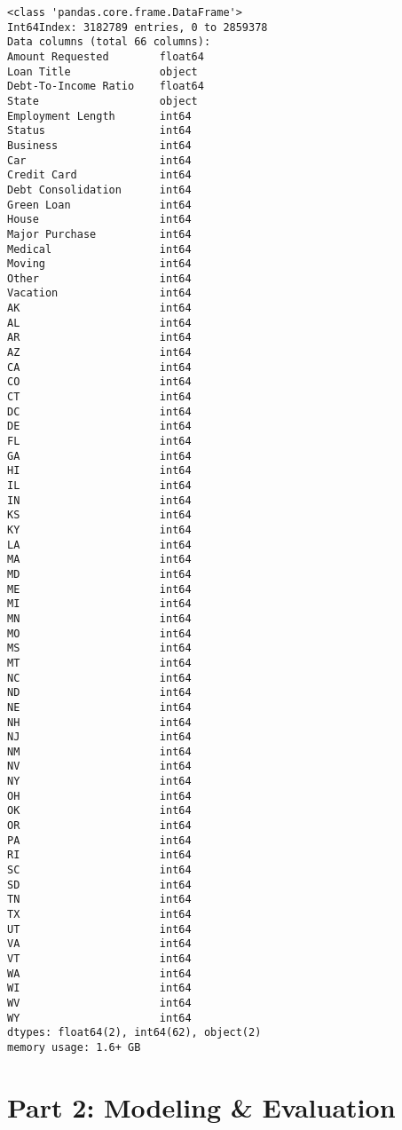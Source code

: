 \documentclass[11pt]{article}
\begin{document}
    \begin{Verbatim}[commandchars=\\\{\},fontsize=\footnotesize]
<class 'pandas.core.frame.DataFrame'>
Int64Index: 3182789 entries, 0 to 2859378
Data columns (total 66 columns):
Amount Requested        float64
Loan Title              object
Debt-To-Income Ratio    float64
State                   object
Employment Length       int64
Status                  int64
Business                int64
Car                     int64
Credit Card             int64
Debt Consolidation      int64
Green Loan              int64
House                   int64
Major Purchase          int64
Medical                 int64
Moving                  int64
Other                   int64
Vacation                int64
AK                      int64
AL                      int64
AR                      int64
AZ                      int64
CA                      int64
CO                      int64
CT                      int64
DC                      int64
DE                      int64
FL                      int64
GA                      int64
HI                      int64
IL                      int64
IN                      int64
KS                      int64
KY                      int64
LA                      int64
MA                      int64
MD                      int64
ME                      int64
MI                      int64
MN                      int64
MO                      int64
MS                      int64
MT                      int64
NC                      int64
ND                      int64
NE                      int64
NH                      int64
NJ                      int64
NM                      int64
NV                      int64
NY                      int64
OH                      int64
OK                      int64
OR                      int64
PA                      int64
RI                      int64
SC                      int64
SD                      int64
TN                      int64
TX                      int64
UT                      int64
VA                      int64
VT                      int64
WA                      int64
WI                      int64
WV                      int64
WY                      int64
dtypes: float64(2), int64(62), object(2)
memory usage: 1.6+ GB

    \end{Verbatim}
\newpage
    \section{Part 2: Modeling \& Evaluation}
\end{document}
